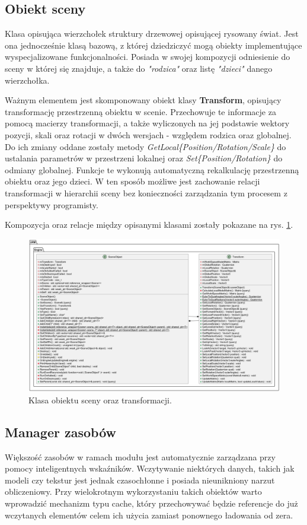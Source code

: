 	
\subsection{Obiekt sceny}
	Klasa opisująca wierzchołek struktury drzewowej opisującej rysowany świat. Jest ona jednocześnie klasą bazową, z której dziedziczyć mogą obiekty implementujące wyspecjalizowane funkcjonalności. Posiada w swojej kompozycji odniesienie do sceny w której się znajduje, a także do \textit{"rodzica"} oraz listę \textit{"dzieci"} danego wierzchołka. 
	
	Ważnym elementem jest skomponowany obiekt klasy \textbf{Transform}, opisujący transformację przestrzenną obiektu w scenie. Przechowuje te informacje za pomocą macierzy transformacji, a także wyliczonych na jej podstawie wektory pozycji, skali oraz rotacji w dwóch wersjach - względem rodzica oraz globalnej. Do ich zmiany oddane zostały metody \textit{GetLocal\{Position/Rotation/Scale\}} do ustalania parametrów w przestrzeni lokalnej oraz \textit{Set\{Position/Rotation\}} do odmiany globalnej. Funkcje te wykonują automatyczną rekalkulację przestrzenną obiektu oraz jego dzieci. W ten sposób możliwe jest zachowanie relacji transformacji w hierarchii sceny bez konieczności zarządzania tym procesem z perspektywy programisty.
	
	Kompozycja oraz relacje między opisanymi klasami zostały pokazane na rys. \ref{UML_SceneObject}.
	
	\begin{figure}[h!]
		\centering
		\includegraphics[width=\textwidth]{images/UML/sceneobject.png}
		\caption{Klasa obiektu sceny oraz transformacji.}
		\label{UML_SceneObject}
	\end{figure}
	
\subsection{Manager zasobów}
	Większość zasobów w ramach modułu jest automatycznie zarządzana przy pomocy inteligentnych wskaźników. Wczytywanie niektórych danych, takich jak modeli czy tekstur jest jednak czasochłonne i posiada nieunikniony narzut obliczeniowy. Przy wielokrotnym wykorzystaniu takich obiektów warto wprowadzić mechanizm typu cache, który przechowywać będzie referencje do już wczytanych elementów celem ich użycia zamiast ponownego ładowania od zera.
	
